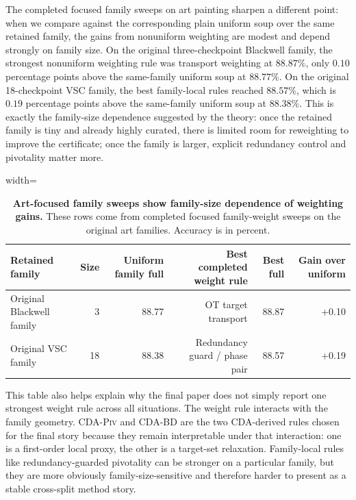 \documentclass{article}
\theoremstyle{definition}
\newcommand{\piv}{\textup{\textsc{CDA-Piv}}}
\newcommand{\bd}{\textup{\textsc{CDA-BD}}}
\begin{document}
The completed focused family sweeps on art painting sharpen a different point: when we compare against the corresponding plain uniform soup over the same retained family, the gains from nonuniform weighting are modest and depend strongly on family size. On the original three-checkpoint Blackwell family, the strongest nonuniform weighting rule was transport weighting at \(88.87\%\), only \(0.10\) percentage points above the same-family uniform soup at \(88.77\%\). On the original 18-checkpoint VSC family, the best family-local rules reached \(88.57\%\), which is \(0.19\) percentage points above the same-family uniform soup at \(88.38\%\). This is exactly the family-size dependence suggested by the theory: once the retained family is tiny and already highly curated, there is limited room for reweighting to improve the certificate; once the family is larger, explicit redundancy control and pivotality matter more.

\begin{table}[t]
\centering
\caption{\textbf{Art-focused family sweeps show family-size dependence of weighting gains.} These rows come from completed focused family-weight sweeps on the original art families. Accuracy is in percent.}
\label{tab:art_family_sweeps}
\begin{adjustbox}{width=\linewidth}
\begin{tabular}{lrrrrr}
\toprule
Retained family & Size & Uniform family full & Best completed weight rule & Best full & Gain over uniform \\
\midrule
Original Blackwell family & 3 & 88.77 & OT target transport & 88.87 & +0.10 \\
Original VSC family & 18 & 88.38 & Redundancy guard / phase pair & 88.57 & +0.19 \\
\bottomrule
\end{tabular}
\end{adjustbox}
\end{table}

This table also helps explain why the final paper does not simply report one strongest weight rule across all situations. The weight rule interacts with the family geometry. \piv{} and \bd{} are the two CDA-derived rules chosen for the final story because they remain interpretable under that interaction: one is a first-order local proxy, the other is a target-set relaxation. Family-local rules like redundancy-guarded pivotality can be stronger on a particular family, but they are more obviously family-size-sensitive and therefore harder to present as a stable cross-split method story.
\end{document}
